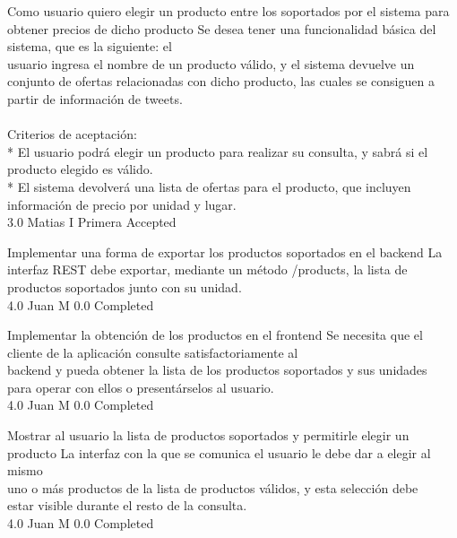 \vspace{20pt}

	{Como usuario quiero elegir un producto entre los soportados por el sistema para obtener precios de dicho producto} %
	{Se desea tener una funcionalidad básica del sistema, que es la siguiente: el\\
usuario ingresa el nombre de un producto válido, y el sistema devuelve un\\
conjunto de ofertas relacionadas con dicho producto, las cuales se consiguen a\\
partir de información de tweets.\\
  \\
Criterios de aceptación:\\
* El usuario podrá elegir un producto para realizar su consulta, y sabrá si el producto elegido es válido.  \\
* El sistema devolverá una lista de ofertas para el producto, que incluyen información de precio por unidad y lugar.\\
} %
	{} %
	{3.0} %
	{Matias I} %
	{Primera} %
	{Accepted} %

		{Implementar una forma de exportar los productos soportados en el backend} %
		{La interfaz REST debe exportar, mediante un método /products, la lista de\\
productos soportados junto con su unidad.\\
} %
		{4.0} %
		{Juan M} %
		{0.0} %
		{Completed} %

		{Implementar la obtención de los productos en el frontend} %
		{Se necesita que el cliente de la aplicación consulte satisfactoriamente al\\
backend y pueda obtener la lista de los productos soportados y sus unidades\\
para operar con ellos o presentárselos al usuario.\\
} %
		{4.0} %
		{Juan M} %
		{0.0} %
		{Completed} %

		{Mostrar al usuario la lista de productos soportados y permitirle elegir un producto} %
		{La interfaz con la que se comunica el usuario le debe dar a elegir al mismo\\
uno o más productos de la lista de productos válidos, y esta selección debe\\
estar visible durante el resto de la consulta.\\
} %
		{4.0} %
		{Juan M} %
		{0.0} %
		{Completed} %


